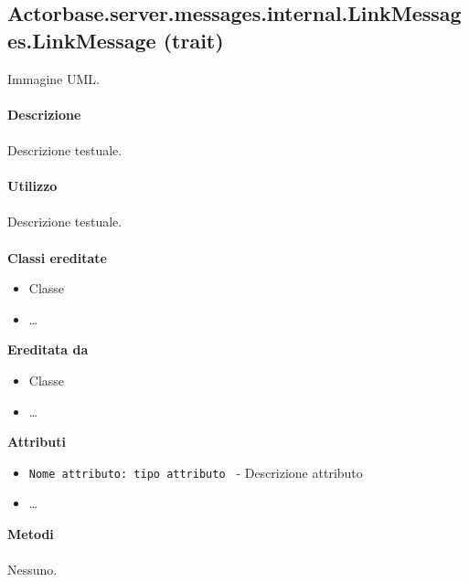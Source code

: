 \documentclass[a4paper]{article}
\begin{document}
	\subsection{Actorbase.server.messages.internal.LinkMessages.LinkMessage (trait)}
		Immagine UML.
		\\ \\
		\textbf{Descrizione}
			\\ \\
			Descrizione testuale.
			\\ \\
		\textbf{Utilizzo}
			\\ \\
			Descrizione testuale.
			\\ \\
		\textbf{Classi ereditate}
			\begin{itemize}
				\item Classe
				\item \dots
			\end{itemize}
		\textbf{Ereditata da}
			\begin{itemize}
				\item Classe
				\item \dots
			\end{itemize}
		\textbf{Attributi}
			\begin{itemize}
				\item \texttt{Nome attributo: tipo attributo } - Descrizione attributo
				\item \dots
			\end{itemize}
		\textbf{Metodi}
			\\ \\
			Nessuno.
			
\end{document}
